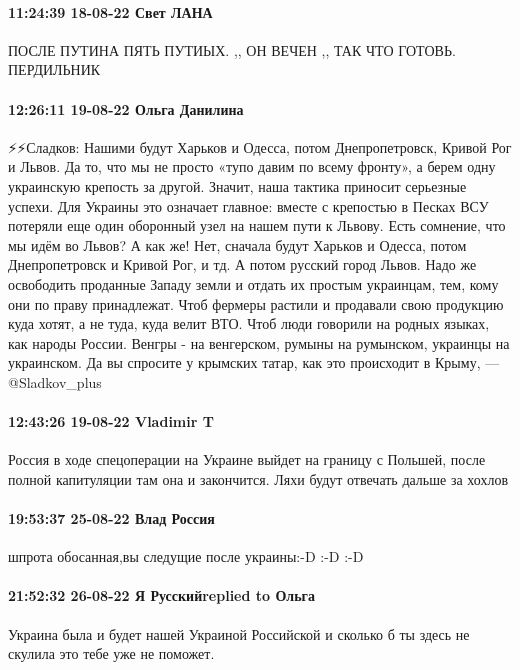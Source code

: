 \paragraph{11:24:39 18-08-22 Свет ЛАНА}

ПОСЛЕ ПУТИНА ПЯТЬ ПУТИЫХ. ,, ОН ВЕЧЕН ,, ТАК ЧТО ГОТОВЬ. ПЕРДИЛЬНИК

\paragraph{12:26:11 19-08-22 Ольга Данилина}

⚡⚡Сладков:
Нашими будут Харьков и Одесса, потом Днепропетровск, Кривой Рог и Львов. Да то, что мы не просто «тупо давим по всему фронту», а берем одну украинскую крепость за другой. Значит, наша тактика приносит серьезные успехи.
Для Украины это означает главное: вместе с крепостью в Песках ВСУ потеряли еще один оборонный узел на нашем пути к Львову.
Есть сомнение, что мы идём во Львов? А как же!
Нет, сначала будут Харьков и Одесса, потом Днепропетровск и Кривой Рог, и тд. А потом русский город Львов.
Надо же освободить проданные Западу земли и отдать их простым украинцам, тем, кому они по праву принадлежат. Чтоб фермеры растили и продавали свою продукцию куда хотят, а не туда, куда велит ВТО.
Чтоб люди говорили на родных языках, как народы России. Венгры - на венгерском, румыны на румынском, украинцы на украинском. Да вы спросите у крымских татар, как это происходит в Крыму, — @Sladkov_plus

\paragraph{12:43:26 19-08-22 Vladimir T}

Россия в ходе спецоперации на Украине выйдет на границу с Польшей, после полной
капитуляции там она и закончится.
Ляхи будут отвечать дальше за хохлов

\paragraph{19:53:37 25-08-22 Влад Россия}

шпрота обосанная,вы следущие после украины:-D :-D :-D

\paragraph{21:52:32 26-08-22 Я Русскийreplied to Ольга}

Украина была и будет нашей Украиной Российской и сколько б ты здесь не скулила
это тебе уже не поможет.

